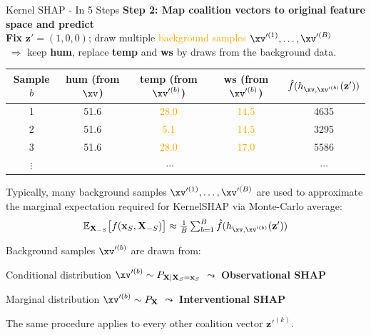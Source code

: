 \documentclass[10pt,compress,t,notes=noshow, xcolor=table]{beamer}
\begin{document}
\begin{framev}[fs=small,align=top]{Kernel SHAP - In 5 Steps}
\textbf{Step 2: Map coalition vectors to original feature space and predict}
\\%
\textbf{Fix} \(\mathbf{z}'=(1,0,0)\); draw multiple \textcolor{orange}{background samples $\xv'^{(1)}, \dots, \xv'^{(B)}$}\\
\(\;\Rightarrow\) keep \textbf{hum}, replace \textbf{temp} and \textbf{ws} by draws from the background data.
\begin{table}
\centering
\begin{small}
\begin{tabular}{c|ccc|c}
Sample \(b\) & hum (from \(\xv\)) & temp (from $\xv'^{(b)}$) & ws (from $\xv'^{(b)}$)  & \(\hat{f}(h_{\xv, \xv'^{(b)}}(\mathbf{z}'))\) \\
\hline
1 & 51.6 & \textcolor{orange}{28.0} & \textcolor{orange}{14.5} & 4635 \\
2 & 51.6 & \textcolor{orange}{5.1} & \textcolor{orange}{14.5} & 3295 \\
3 & 51.6 & \textcolor{orange}{28.0} & \textcolor{orange}{17.0} & 5586 \\
$\vdots$ & \multicolumn{3}{c}{$\cdots$} & $\cdots$ \\
\end{tabular}
\end{small}
\end{table}


\begin{itemizeM}
\item Typically, many background samples $\xv'^{(1)}, \dots, \xv'^{(B)}$ are used to approximate the marginal expectation required for KernelSHAP via Monte-Carlo average:
$$ \textstyle \mathbb{E}_{\mathbf{X}_{-S}}\bigl[f(\mathbf{x}_S,\mathbf{X}_{-S})\bigr] \approx
\frac{1}{B}\sum_{b=1}^{B}\hat{f}(h_{\xv, \xv'^{(b)}}(\mathbf{z}'))$$
\item Background samples \( \xv'^{(b)} \) are drawn from:
\begin{itemizeS}
\item Conditional distribution \( \xv'^{(b)} \sim P_{\mathbf{X} \mid \mathbf{X}_S = \mathbf{x}_S} \) $\leadsto$ \textbf{Observational SHAP}
\item Marginal distribution \( \xv'^{(b)} \sim P_{\mathbf{X}} \) $\leadsto$ \textbf{Interventional SHAP}
\end{itemizeS}
\item The same procedure applies to every other coalition vector \(\mathbf{z}'^{(k)}\).
\end{itemizeM}
\end{framev}
\end{document}
